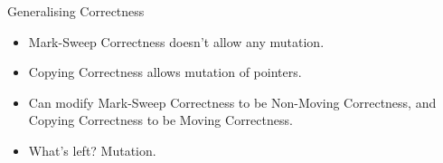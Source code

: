 \documentclass[usenames,dvipsnames]{beamer}
\begin{document}
\begin{frame}{Generalising Correctness}
  \begin{itemize}
  \item Mark-Sweep Correctness doesn't allow any mutation.
  \item Copying Correctness allows mutation of pointers.
  \item Can modify Mark-Sweep Correctness to be Non-Moving
    Correctness, and Copying Correctness to be Moving Correctness.
  \item What's left? Mutation.
  \end{itemize}





\end{frame}
\end{document}
